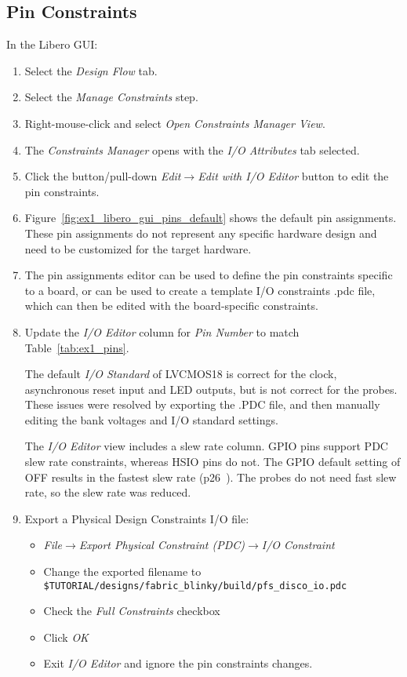 \clearpage
\subsection{Pin Constraints}

In the Libero GUI:
%
\begin{enumerate}
\item Select the \emph{Design Flow} tab.
\item Select the \emph{Manage Constraints} step.
\item Right-mouse-click and select \emph{Open Constraints Manager View}.
\item The \emph{Constraints Manager} opens with the \emph{I/O Attributes}
tab selected.
\item Click the button/pull-down \emph{Edit$\rightarrow$Edit with I/O Editor}
button to edit the pin constraints.
\item Figure~\ref{fig:ex1_libero_gui_pins_default} shows the default pin
assignments. These pin assignments do not represent any specific hardware
design and need to be customized for the target hardware.

\item The pin assignments editor can be used to define the pin constraints specific
to a board, or can be used to create a template I/O constraints .pdc file, which
can then be edited with the board-specific constraints.
%
\item Update the \emph{I/O Editor} column for \emph{Pin Number} to match
Table~\ref{tab:ex1_pins}.

The default \emph{I/O Standard} of LVCMOS18 is correct for the clock,
asynchronous reset input and LED outputs, but is not correct for the probes.
These issues were resolved by exporting the .PDC file, and then manually
editing the bank voltages and I/O standard settings.

The \emph{I/O Editor} view includes a slew rate column. GPIO pins support
PDC slew rate constraints, whereas HSIO pins do not.
The GPIO default setting of OFF results in the fastest slew rate
(p26~\cite{Microchip_PFSoC_IO_2025}). The probes do not need fast slew rate,
so the slew rate was reduced.

\item Export a Physical Design Constraints I/O file:
\begin{itemize}
\item \emph{File$\rightarrow$Export Physical Constraint (PDC)$\rightarrow$I/O Constraint}
\item Change the exported filename to\newline
\verb+$TUTORIAL/designs/fabric_blinky/build/pfs_disco_io.pdc+%
\item Check the \emph{Full Constraints} checkbox
\item Click \emph{OK}
\item Exit \emph{I/O Editor} and ignore the pin constraints changes.
\end{itemize}


\end{enumerate}
